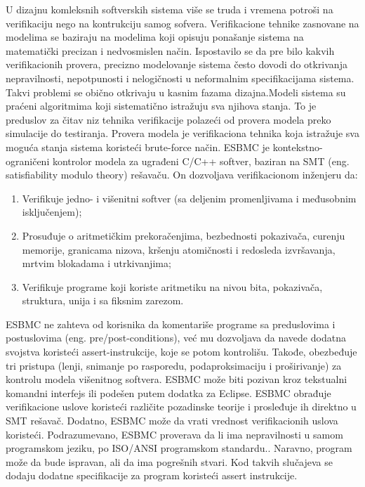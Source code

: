 \documentclass[a4paper]{article}
\begin{document}
U dizajnu komleksnih softverskih sistema više se truda i vremena potroši na
verifikaciju nego na kontrukciju samog sofvera. Verifikacione tehnike  zasnovane na modelima se baziraju na modelima koji opisuju ponašanje sistema na matematički precizan i nedvosmislen način. Ispostavilo se da pre bilo kakvih verifikacionih provera, precizno modelovanje sistema često dovodi do otkrivanja nepravilnosti, nepotpunosti i nelogičnosti u neformalnim specifikacijama sistema. Takvi problemi se obično otkrivaju u kasnim fazama dizajna.Modeli sistema su praćeni algoritmima koji sistematično istražuju sva njihova stanja. To je preduslov za čitav niz tehnika verifikacije polazeći od provera modela preko simulacije do testiranja.
Provera modela je verifikaciona tehnika koja istražuje sva moguća stanja sistema koristeći brute-force način.
\newline
ESBMC je kontekstno-ograničeni kontrolor modela za ugrađeni C/C++ softver, baziran na SMT (eng. satisﬁability modulo theory) rešavaču.  On dozvoljava verifikacionom inženjeru da: 
\newline
\begin{enumerate}
\item Verifikuje jedno- i višenitni softver (sa deljenim promenljivama i                       međusobnim isključenjem);
\item Prosuđuje o aritmetičkim prekoračenjima, bezbednosti pokazivača, curenju               memorije, granicama nizova, kršenju atomičnosti i redosleda izvršavanja,             mrtvim blokadama i utrkivanjima; 
\item Verifikuje programe koji koriste aritmetiku na nivou bita, pokazivača,                  struktura, unija i sa fiksnim zarezom.
\end{enumerate}
ESBMC ne zahteva od korisnika da komentariše programe sa preduslovima i postuslovima (eng. pre/post-conditions), već mu dozvoljava da navede dodatna svojstva koristeći assert-instrukcije, koje se potom kontrolišu. Takođe, obezbeđuje tri pristupa (lenji, snimanje po rasporedu, podaproksimaciju i proširivanje) za kontrolu modela višenitnog softvera. ESBMC može biti pozivan kroz tekstualni komandni interfejs ili podešen putem dodatka za Eclipse. ESBMC obrađuje verifikacione uslove koristeći različite pozadinske teorije i prosleđuje ih direktno u SMT rešavač. Dodatno, ESBMC može da vrati vrednost verifikacionih uslova koristeći.
\newline
Podrazumevano, ESBMC proverava da li ima nepravilnosti u samom programskom jeziku, po ISO/ANSI programskom standardu.. Naravno, program može da bude ispravan, ali da ima pogrešnih stvari. Kod takvih slučajeva se dodaju dodatne specifikacije za program koristeći assert instrukcije. 
\end{document}
